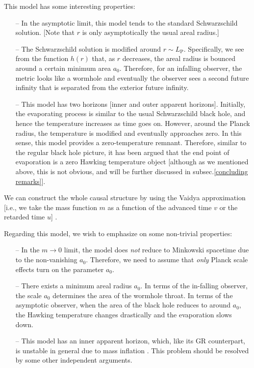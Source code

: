 \documentclass[12pt]{article}
\newcommand{\2}{$^2$}
\newcommand{\3}{$^3$}
\newcommand{\4}{$_4$}
\newcommand{\5}{$_5$}
\begin{document}
This model has some interesting properties:
\begin{itemize}
\item[--] In the asymptotic limit, this model tends to the standard Schwarzschild solution. [Note that $r$ is only asymptotically the usual areal radius.]
\item[--] The Schwarzschild solution is modified around $r \sim L_{\mathrm{P}}$. Specifically, we see from the function $h(r)$ that, as $r$ decreases, the areal radius is bounced around a certain minimum area $a_{0}$. Therefore, for an infalling observer, the metric looks like a wormhole and eventually the observer sees a second future infinity that is separated from the exterior future infinity.
\item[--] This model has two horizons [inner and outer apparent horizons]. Initially, the evaporating process is similar to the usual Schwarzschild black hole, and hence the temperature increases as time goes on. However, around the Planck radius, the temperature is modified and eventually approaches zero. In this sense, this model provides a zero-temperature remnant. Therefore, similar to the regular black hole picture, it has been argued that the end point of evaporation is a zero Hawking temperature object [although as we mentioned above, this is not obvious, and will be further discussed in subsec.\ref{concluding remarks}]. 
\end{itemize}
We can construct the whole causal structure by using the Vaidya approximation [i.e., we take the mass function $m$ as a function of the advanced time $v$ or the retarded time $u$] \cite{Hossenfelder:2009fc}.

Regarding this model, we wish to emphasize on some non-trivial properties:
\begin{itemize}
\item[--] In the $m \rightarrow 0$ limit, the model does \emph{not} reduce to Minkowski spacetime due to the non-vanishing $a_{0}$. Therefore, we need to assume that \emph{only} Planck scale effects turn on the parameter $a_{0}$.
\item[--] There exists a minimum areal radius $a_{0}$. In terms of the in-falling observer, the scale $a_{0}$ determines the area of the wormhole throat. In terms of the asymptotic observer, when the area of the black hole reduces to around $a_{0}$, the Hawking temperature changes drastically and the evaporation slows down. 
\item[--] This model has an inner apparent horizon, which, like its GR counterpart, is unstable in general due to mass inflation \cite{Brown:2011tv}. This problem should be resolved by some other independent arguments.
\end{itemize}
\end{document}
